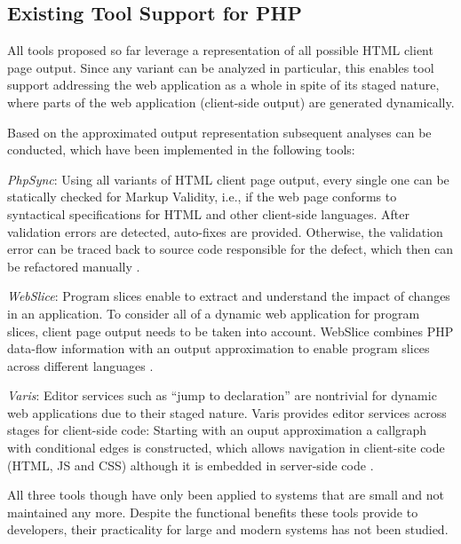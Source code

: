 \documentclass[preprint]{sig-alternate-05-2015}
\begin{document}
\subsection{Existing Tool Support for PHP}
All tools proposed so far leverage a representation of all possible HTML client
page output. Since any variant can be analyzed in particular, this enables tool
support addressing the web application as a whole in spite of its staged
nature, where parts of the web application (client-side output) are generated
dynamically.

Based on the approximated output representation subsequent analyses can be
conducted, which have been implemented in the following tools:

\begin{compactitem}
	\item \emph{PhpSync}: Using all variants of  HTML client page output, every
	single one can be statically checked for Markup Validity, i.e., if the web page
	conforms to syntactical specifications for HTML and other client-side
	languages. After validation errors are detected, auto-fixes are provided.
	Otherwise, the validation error can be traced back to source code responsible
	for the defect, which then can be refactored manually
	\cite{Nguyen:2011:AFH:2190078.2190142}.

	\item \emph{WebSlice}: Program slices enable to extract and understand the
	impact of changes in an application. To consider all of a dynamic web
	application for program slices, client page output needs to be taken into
	account. WebSlice combines PHP data-flow information with an output
	approximation to enable program slices across different languages
	\cite{Nguyen:2015:CPS:2786805.2786872}.

	\item \emph{Varis}: Editor services such as “jump to declaration” are
	nontrivial for dynamic web applications due to their staged nature. Varis
	provides editor services across stages for client-side code: Starting with an
	ouput approximation a callgraph with conditional edges is constructed, which
	allows navigation in client-site code (HTML, JS and CSS) although it is
	embedded in server-side code
	\cite{Nguyen:2015:VIS:2819009.2819140,Nguyen:2014:BCG:2635868.2635928}.
\end{compactitem}

All three tools though have only been applied to systems that are small and not
maintained any more. Despite the functional benefits these tools provide to
developers, their practicality for large and modern systems has not been
studied.
\end{document}
